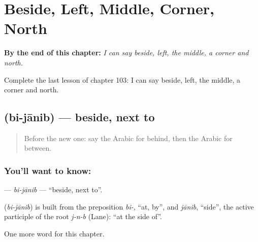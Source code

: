 
\chapter{Beside, Left, Middle, Corner, North}
\label{ch:ar-beside-left-middle-corner-north}

\begin{chapteropening}
\textbf{By the end of this chapter:} \emph{I can say beside, left, the middle, a corner and north.}

Complete the last lesson of chapter 103: I can say beside, left, the middle, a corner and north.
\end{chapteropening}

\section[\texorpdfstring{\ar{بجانب} (bi-jānib)}{بجانب (bi-jānib)}]{ (bi-jānib) — beside, next to}

\label{lesson:AR-C103-bijanib}



\begin{quote}
Before the new one: say the Arabic for behind, then the Arabic for between.
\end{quote}

\subsection*{You'll want to know: }
\textbf{} — \emph{bi-jānib} — \textquotedblleft{}beside, next to\textquotedblright{}.

\begin{cousinweb}
\textbf{} (\emph{bi-jānib}) is built from the preposition \emph{bi-}, \textquotedblleft{}at, by\textquotedblright{}, and \emph{jānib}, \textquotedblleft{}side\textquotedblright{}, the active participle of the root \emph{j-n-b} (Lane): \textquotedblleft{}at the side of\textquotedblright{}.
\end{cousinweb}

\begin{grammarlens}[title={What you've built}]
One more word for this chapter.
\end{grammarlens}


